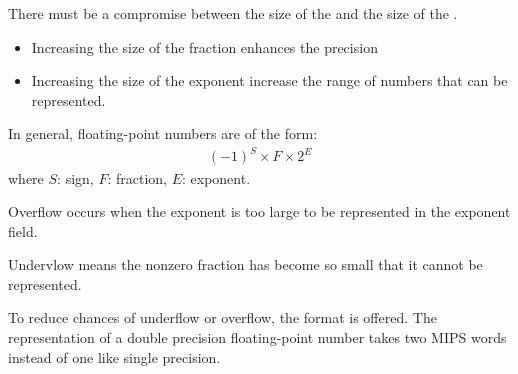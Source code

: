       \par There must be a compromise between the size of the  and
      the size of the .
      \begin{itemize}
        \item Increasing the size of the fraction enhances the precision
        \item Increasing the size of the exponent increase the range of numbers
          that can be represented.
      \end{itemize}
      \par In general, floating-point numbers are of the form:
        \begin{align*}
          (-1)^{S} \times F \times 2^{E}
        \end{align*}
        where $S$: sign, $F$: fraction, $E$: exponent.

      \par Overflow occurs when the exponent is too large to be represented in
        the exponent field.
      \par Undervlow means the nonzero fraction has become so small that it
        cannot be represented.

      \par To reduce chances of underflow or overflow, the  format is offered. The representation of a double precision
        floating-point number takes two MIPS words instead of one like single
        precision.

